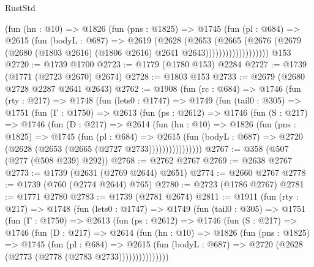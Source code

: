 \begin{lexlean}{RustStd}
\begin{coremodule}
                      (fun (hn : @10) =>
                      @1826
                        (fun (pns : @1825) =>
                        @1745
                          (fun (pl : @684) =>
                          @2615
                            (fun (bodyL : @687) =>
                            @2619
                              (@2628
                                (@2653
                                  (@2665
                                    (@2676
                                      (@2679
                                        (@2680
                                          (@1803 @2616)
                                          (@1806 @2616)
                                          @2641
                                          @2643)))))))))))))))))))
    @153
@2720 := @1739 @1700
@2723 := @1779 (@1780 @153) @2284
@2727 := @1739 (@1771 (@2723 @2670) @2674)
@2728 := @1803 @153
@2733 := @2679 (@2680 @2728 @2287 @2641 @2643)
@2762 := @1908
    (fun (rc : @684) =>
    @1746
      (fun (rty : @217) =>
      @1748
        (fun (lets0 : @1747) =>
        @1749
          (fun (tail0 : @305) =>
          @1751
            (fun (Γ : @1750) =>
            @2613
              (fun (ps : @2612) =>
              @1746
                (fun (S : @217) =>
                @1746
                  (fun (D : @217) =>
                  @2614
                    (fun (hn : @10) =>
                    @1826
                      (fun (pns : @1825) =>
                      @1745
                        (fun (pl : @684) =>
                        @2615
                          (fun (bodyL : @687) =>
                          @2720 (@2628 (@2653 (@2665 (@2727 @2733))))))))))))))))
@2767 := @358 (@507 (@277 (@508 @239) @292))
@2768 := @2762 @2767
@2769 := @2638 @2767
@2773 := @1739 (@2631 (@2769 @2644) @2651)
@2774 := @2660 @2767
@2778 := @1739 (@760 (@2774 @2644) @765)
@2780 := @2723 (@1786 @2767)
@2781 := @1771 @2780
@2783 := @1739 (@2781 @2674)
@2811 := @1911
    (fun (rty : @217) =>
    @1748
      (fun (lets0 : @1747) =>
      @1749
        (fun (tail0 : @305) =>
        @1751
          (fun (Γ : @1750) =>
          @2613
            (fun (ps : @2612) =>
            @1746
              (fun (S : @217) =>
              @1746
                (fun (D : @217) =>
                @2614
                  (fun (hn : @10) =>
                  @1826
                    (fun (pns : @1825) =>
                    @1745
                      (fun (pl : @684) =>
                      @2615
                        (fun (bodyL : @687) =>
                        @2720 (@2628 (@2773 (@2778 (@2783 @2733)))))))))))))))

\end{coremodule}
\end{lexlean}
